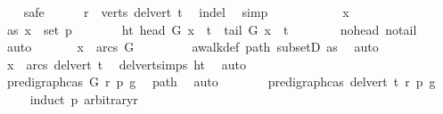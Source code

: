 \begin{isabellebody}
\ \ \isamarkupfalse%
\ safe\isanewline
\ \ \ \ \isamarkupfalse%
\ {\isachardoublequoteopen}r\ {\isasymin}\ verts\ {\isacharparenleft}{\kern0pt}del{\isacharunderscore}{\kern0pt}vert\ t{\isacharparenright}{\kern0pt}{\isachardoublequoteclose}\ \isamarkupfalse%
\ in{\isacharunderscore}{\kern0pt}del\ \isamarkupfalse%
\ simp\ \ \ \isanewline
\ \ \isamarkupfalse%
\isanewline
\ \ \ \ \isamarkupfalse%
\ x\isanewline
\ \ \ \ \isamarkupfalse%
\ as{}{\isacharcolon}{\kern0pt}\ {\isachardoublequoteopen}x\ {\isasymin}\ set\ p{\isachardoublequoteclose}\isanewline
\ \ \ \ \isamarkupfalse%
\ \isamarkupfalse%
\ ht{\isacharcolon}{\kern0pt}\ {\isachardoublequoteopen}head\ G\ x\ {\isasymnoteq}\ t\ {\isasymand}\ tail\ G\ x\ {\isasymnoteq}\ t{\isachardoublequoteclose}\isanewline
\ \ \ \ \ \ \isamarkupfalse%
\ no{\isacharunderscore}{\kern0pt}head\ no{\isacharunderscore}{\kern0pt}tail\ \isamarkupfalse%
\ auto\isanewline
\ \ \ \ \isamarkupfalse%
\ {\isachardoublequoteopen}\ x\ {\isasymin}\ arcs\ G{\isachardoublequoteclose}\ \isanewline
\ \ \ \ \ \ \isamarkupfalse%
\ awalk{\isacharunderscore}{\kern0pt}def\ path\ subsetD\ as{}\ \isamarkupfalse%
\ auto\isanewline
\ \ \ \ \isamarkupfalse%
\ \isamarkupfalse%
\ {\isachardoublequoteopen}x\ {\isasymin}\ arcs\ {\isacharparenleft}{\kern0pt}del{\isacharunderscore}{\kern0pt}vert\ t{\isacharparenright}{\kern0pt}{\isachardoublequoteclose}\ \isamarkupfalse%
\ del{\isacharunderscore}{\kern0pt}vert{\isacharunderscore}{\kern0pt}simps{\isacharparenleft}{\kern0pt}{}{\isacharparenright}{\kern0pt}\ ht\ \isamarkupfalse%
\ auto\ \ \ \isanewline
\ \ \isamarkupfalse%
\isanewline
\ \ \ \ \isamarkupfalse%
\ {\isachardoublequoteopen}pre{\isacharunderscore}{\kern0pt}digraph{\isachardot}{\kern0pt}cas\ G\ r\ p\ g{\isachardoublequoteclose}\ \isamarkupfalse%
\ path\ \isamarkupfalse%
\ auto\isanewline
\ \ \ \ \isamarkupfalse%
\ \isamarkupfalse%
\ {\isachardoublequoteopen}pre{\isacharunderscore}{\kern0pt}digraph{\isachardot}{\kern0pt}cas\ {\isacharparenleft}{\kern0pt}del{\isacharunderscore}{\kern0pt}vert\ t{\isacharparenright}{\kern0pt}\ r\ p\ g{\isachardoublequoteclose}\isanewline
\ \ \ \ \isamarkupfalse%
{\isacharparenleft}{\kern0pt}induct\ p\ arbitrary{\isacharcolon}{\kern0pt}r{\isacharparenright}{\kern0pt}\isanewline

\end{isabellebody}
